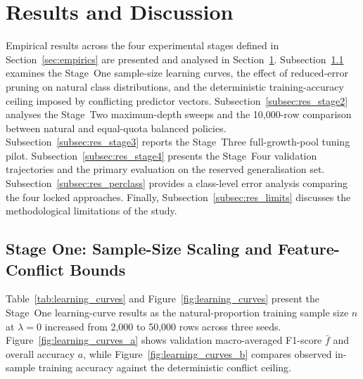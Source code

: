 \section{Results and Discussion}
\label{sec:results}

Empirical results across the four experimental stages defined in Section~\ref{sec:empirics} are presented and analysed in Section~\ref{sec:results}. Subsection~\ref{subsec:res_stage1} examines the Stage~One sample-size learning curves, the effect of reduced-error pruning on natural class distributions, and the deterministic training-accuracy ceiling imposed by conflicting predictor vectors. Subsection~\ref{subsec:res_stage2} analyses the Stage~Two maximum-depth sweeps and the 10,000-row comparison between natural and equal-quota balanced policies. Subsection~\ref{subsec:res_stage3} reports the Stage~Three full-growth-pool tuning pilot. Subsection~\ref{subsec:res_stage4} presents the Stage~Four validation trajectories and the primary evaluation on the reserved generalisation set. Subsection~\ref{subsec:res_perclass} provides a class-level error analysis comparing the four locked approaches. Finally, Subsection~\ref{subsec:res_limits} discusses the methodological limitations of the study.

\subsection{Stage One: Sample-Size Scaling and Feature-Conflict Bounds}
\label{subsec:res_stage1}
Table~\ref{tab:learning_curves} and Figure~\ref{fig:learning_curves} present the Stage~One learning-curve results as the natural-proportion training sample size $n$ at $\lambda = 0$ increased from 2,000 to 50,000 rows across three seeds. Figure~\ref{fig:learning_curves_a} shows validation macro-averaged F1-score $\bar{f}$ and overall accuracy $a$, while Figure~\ref{fig:learning_curves_b} compares observed in-sample training accuracy against the deterministic conflict ceiling.

